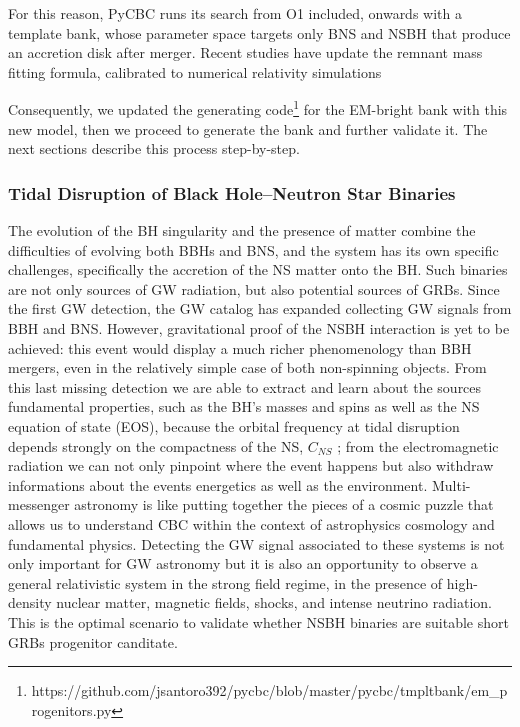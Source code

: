 \documentclass[binding=0.6cm, LaM]{sapthesis}
\begin{document}
	For this reason, {\ttfamily PyCBC} runs its search from O1 included,  onwards with a template bank,
	whose parameter space  targets only BNS and NSBH that produce an accretion disk after merger.
	Recent studies have update the remnant mass fitting formula, 	
	calibrated to numerical relativity  simulations \cite{205}
	
	Consequently, we updated the generating code\footnote{https://github.com/jsantoro392/pycbc/blob/master/pycbc/tmpltbank/em\_progenitors.py}
	for the EM-bright bank with this new model, then we proceed to generate the bank and further validate it.
	The next sections describe this process step-by-step.

\subsubsection{Tidal Disruption of Black Hole--Neutron Star Binaries}
\label{subsubsec:mrem_model}        
	The evolution of the BH singularity and the presence of matter combine
        the difficulties of evolving both BBHs and BNS, and the system has its own specific challenges,
        specifically the accretion of the NS matter onto the BH.
        Such binaries are not only sources of GW radiation, but also potential sources of GRBs.
        Since the first GW detection, the GW catalog has expanded collecting GW signals from BBH and BNS.
        However, gravitational proof of the NSBH interaction is yet to be achieved:
        this event would display a much richer phenomenology than BBH mergers,
        even in the relatively simple case of both non-spinning objects.
        From this last missing detection we are able to extract and learn about
        the sources fundamental properties, such as the BH’s masses and spins
        as well as the NS equation of state (EOS), because the orbital frequency at tidal disruption
        depends strongly on the compactness of the NS, $C_{NS}$ \cite{204};
        from the electromagnetic radiation we can not only
        pinpoint where the event happens but also withdraw informations about the events energetics as well as the environment.
        Multi-messenger astronomy is like putting together the pieces of a cosmic puzzle
        that allows us to understand CBC within the context of astrophysics cosmology and fundamental physics.
        Detecting the GW signal associated to these systems is not only important for
        GW astronomy but it is also an opportunity to observe a general relativistic system in the strong field regime,
        in the presence of high-density nuclear matter, magnetic fields, shocks, and intense neutrino radiation.
        This is the optimal scenario to validate whether NSBH binaries are suitable short GRBs progenitor canditate.
\end{document}
